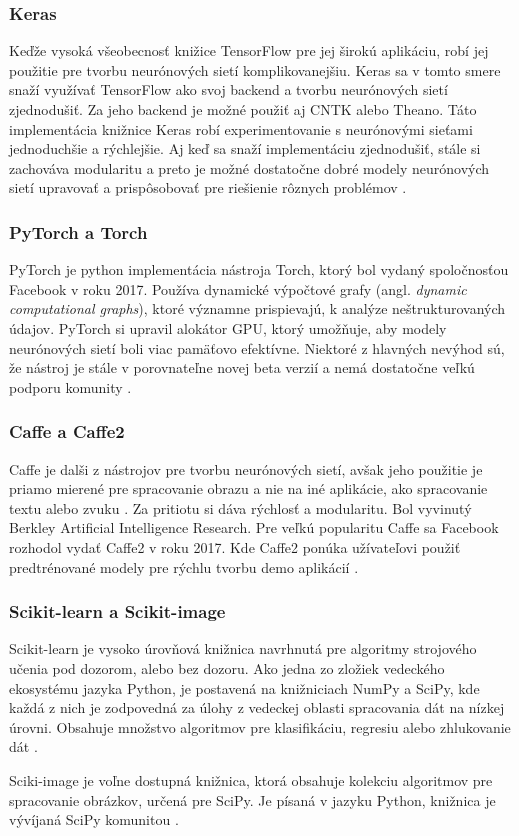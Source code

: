 \subsubsection{Keras}
Keďže vysoká všeobecnosť knižice TensorFlow pre jej širokú aplikáciu, robí jej použitie pre tvorbu neurónových sietí komplikovanejšiu.
Keras sa v tomto smere snaží využívať TensorFlow ako svoj backend a tvorbu neurónových sietí zjednodušiť.
Za jeho backend je možné použiť aj CNTK alebo Theano.
Táto implementácia knižnice Keras robí experimentovanie s neurónovými sieťami jednoduchšie a rýchlejšie.
Aj keď sa snaží implementáciu zjednodušiť, stále si zachováva modularitu a preto je možné dostatočne dobré modely neurónových sietí upravovať a prispôsobovať pre riešienie rôznych problémov \cite{odkaz:Keras}.

\subsubsection{PyTorch a Torch}
PyTorch je python implementácia nástroja Torch, ktorý bol vydaný spoločnosťou Facebook v roku 2017.
Používa dynamické výpočtové grafy (angl. \textit{dynamic computational graphs}), ktoré významne prispievajú, k analýze neštrukturovaných údajov.
PyTorch si upravil alokátor GPU, ktorý umožňuje, aby modely neurónových sietí boli viac pamäťovo efektívne.
Niektoré z hlavných nevýhod sú, že nástroj je stále v porovnateľne novej beta verzií a nemá dostatočne veľkú podporu komunity \cite{odkaz:FrameworkComparison}.

\subsubsection{Caffe a Caffe2}
Caffe je dalši z nástrojov pre tvorbu neurónových sietí, avšak jeho použitie je priamo mierené pre spracovanie obrazu a nie na iné aplikácie,
    ako spracovanie textu alebo zvuku \cite{odkaz:FrameworkComparison2}.
Za pritiotu si dáva rýchlosť a modularitu. Bol vyvinutý Berkley Artificial Intelligence Research.
Pre veľkú popularitu Caffe sa Facebook rozhodol vydať Caffe2 v roku 2017.
Kde Caffe2 ponúka užívateľovi použiť predtrénované modely pre rýchlu tvorbu demo aplikácií \cite{odkaz:FrameworkComparison}.

\subsubsection{Scikit-learn a Scikit-image}
Scikit-learn je vysoko úrovňová knižnica navrhnutá pre algoritmy strojového učenia pod dozorom, alebo bez dozoru.
Ako jedna zo zložiek vedeckého ekosystému jazyka Python, je postavená na knižniciach NumPy a SciPy, kde každá z nich je zodpovedná za úlohy z vedeckej oblasti spracovania dát na nízkej úrovni.
Obsahuje množstvo algoritmov pre klasifikáciu, regresiu alebo zhlukovanie dát \cite{odkaz:FrameworkComparison3}.

Sciki-image je voľne dostupná knižnica, ktorá obsahuje kolekciu algoritmov pre spracovanie obrázkov, určená pre SciPy.
Je písaná v jazyku Python, knižnica je vývíjaná SciPy komunitou \cite{prop:scikit-image}.
